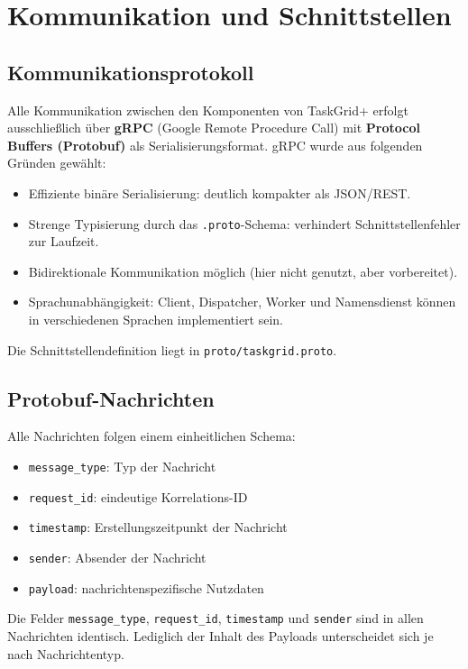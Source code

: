 \section{Kommunikation und Schnittstellen}
\label{sec:kommunikation}

\subsection{Kommunikationsprotokoll}

Alle Kommunikation zwischen den Komponenten von TaskGrid+ erfolgt
ausschließlich über \textbf{gRPC} (Google Remote Procedure Call)
mit \textbf{Protocol Buffers (Protobuf)} als Serialisierungsformat.
gRPC wurde aus folgenden Gründen gewählt:

\begin{itemize}
  \item Effiziente binäre Serialisierung: deutlich kompakter als JSON/REST.
  \item Strenge Typisierung durch das \texttt{.proto}-Schema: verhindert
        Schnittstellenfehler zur Laufzeit.
  \item Bidirektionale Kommunikation möglich (hier nicht genutzt, aber vorbereitet).
  \item Sprachunabhängigkeit: Client, Dispatcher, Worker und Namensdienst
        können in verschiedenen Sprachen implementiert sein.
\end{itemize}

Die Schnittstellendefinition liegt in \texttt{proto/taskgrid.proto}.

\subsection{Protobuf-Nachrichten}
Alle Nachrichten folgen einem einheitlichen Schema:

\begin{itemize}
	\item \texttt{message\_type}: Typ der Nachricht
	\item \texttt{request\_id}: eindeutige Korrelations-ID
	\item \texttt{timestamp}: Erstellungszeitpunkt der Nachricht
	\item \texttt{sender}: Absender der Nachricht
	\item \texttt{payload}: nachrichtenspezifische Nutzdaten
\end{itemize}
Die Felder \texttt{message\_type}, \texttt{request\_id},
\texttt{timestamp} und \texttt{sender} sind in allen Nachrichten identisch.
Lediglich der Inhalt des Payloads unterscheidet sich je nach Nachrichtentyp.

